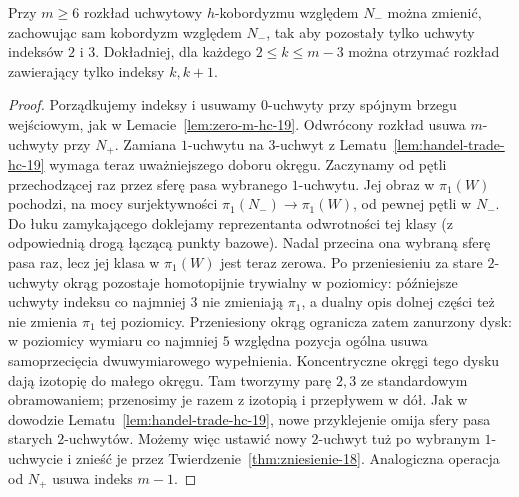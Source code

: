 \begin{lemat}
\label{lem:postac-normalna-20}
Przy $m\geq6$ rozkład uchwytowy $h$-kobordyzmu
względem $N_-$ można zmienić, zachowując sam
kobordyzm względem $N_-$, tak aby pozostały tylko
uchwyty indeksów $2$ i $3$. Dokładniej, dla każdego
$2\leq k\leq m-3$ można otrzymać rozkład zawierający
tylko indeksy $k,k+1$.
\end{lemat}
\begin{proof}
Porządkujemy indeksy i usuwamy $0$-uchwyty przy
spójnym brzegu wejściowym, jak w
Lemacie~\ref{lem:zero-m-hc-19}. Odwrócony rozkład
usuwa $m$-uchwyty przy $N_+$. Zamiana $1$-uchwytu
na $3$-uchwyt z
Lematu~\ref{lem:handel-trade-hc-19} wymaga teraz
uważniejszego doboru okręgu. Zaczynamy od pętli
przechodzącej raz przez sferę pasa wybranego
$1$-uchwytu. Jej obraz w $\pi_1(W)$ pochodzi,
na mocy surjektywności $\pi_1(N_-)\to\pi_1(W)$,
od pewnej pętli w $N_-$. Do łuku zamykającego
doklejamy reprezentanta odwrotności tej klasy
(z odpowiednią drogą łączącą punkty bazowe).
Nadal przecina ona wybraną sferę pasa raz,
lecz jej klasa w $\pi_1(W)$ jest teraz zerowa.
Po przeniesieniu za stare $2$-uchwyty okrąg
pozostaje homotopijnie trywialny w poziomicy:
późniejsze uchwyty indeksu co najmniej $3$
nie zmieniają $\pi_1$, a dualny opis dolnej
części też nie zmienia $\pi_1$ tej poziomicy.
Przeniesiony okrąg ogranicza zatem zanurzony dysk:
w poziomicy wymiaru co najmniej $5$ względna pozycja ogólna
usuwa samoprzecięcia dwuwymiarowego wypełnienia.
Koncentryczne okręgi tego dysku dają izotopię do małego okręgu.
Tam tworzymy parę $2,3$ ze standardowym obramowaniem;
przenosimy je razem z izotopią i przepływem w dół.
Jak w dowodzie Lematu~\ref{lem:handel-trade-hc-19}, nowe
przyklejenie omija sfery pasa starych $2$-uchwytów.
Możemy więc ustawić nowy $2$-uchwyt tuż po wybranym
$1$-uchwycie i znieść je przez Twierdzenie~\ref{thm:zniesienie-18}.
Analogiczna operacja od $N_+$ usuwa indeks $m-1$.


\end{proof}
